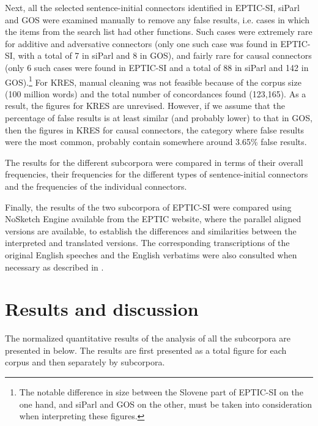 \documentclass[output=paper]{langscibook}
\begin{document}
Next, all the selected sentence-initial connectors identified in EPTIC-SI, siParl and GOS were examined manually to remove any false results, i.e. cases in which the items from the search list had other functions. Such cases were extremely rare for additive and adversative connectors (only one such case was found in EPTIC-SI, with a total of 7 in siParl and 8 in GOS), and fairly rare for causal connectors (only 6 such cases were found in EPTIC-SI and a total of 88 in siParl and 142 in GOS).\footnote{The notable difference in size between the Slovene part of EPTIC-SI on the one hand, and siParl and GOS on the other, must be taken into consideration when interpreting these figures.} For KRES, manual cleaning was not feasible because of the corpus size (100 million words) and the total number of concordances found (123,165). As a result, the figures for KRES are unrevised. However, if we assume that the percentage of false results is at least similar (and probably lower) to that in GOS, then the figures in KRES for causal connectors, the category where false results were the most common, probably contain somewhere around 3.65\% false results.

The results for the different subcorpora were compared in terms of their overall frequencies, their frequencies for the different types of sentence-initial connectors and the frequencies of the individual connectors. 

Finally, the results of the two subcorpora of EPTIC-SI were compared using NoSketch Engine available from the EPTIC website, where the parallel aligned versions are available, to establish the differences and similarities between the interpreted and translated versions. The corresponding transcriptions of the original English speeches and the English verbatims were also consulted when necessary as described in .


\section{
Results and discussion
}\label{sec:mikolic:5}

The normalized quantitative results of the analysis of all the subcorpora are presented in  below. The results are first presented as a total figure for each corpus and then separately by subcorpora.
\end{document}

